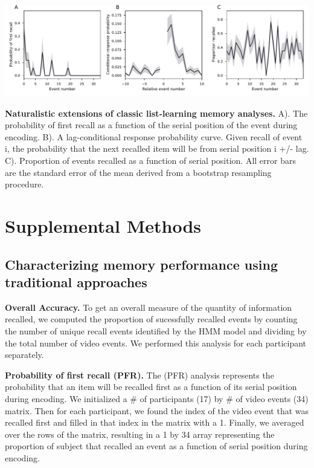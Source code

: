 \documentclass{article}
\begin{document}
{\begin{suppfigure}[t!]
\centering
\includegraphics[width=1\textwidth]{figs/supp3_list_learning.pdf}
\caption{\small \textbf{Naturalistic extensions of classic list-learning memory analyses.} A). The probability of first recall as a function of the serial position of the event during encoding. B). A lag-conditional response probability curve. Given recall of event i, the probability that the next recalled item will be from serial position i +/- lag. C). Proportion of events recalled as a function of serial position. All error bars are the standard error of the mean derived from a bootstrap resampling procedure.}
\label{fig:list-learning}
\end{suppfigure}

\section{Supplemental Methods}

\subsection{Characterizing memory performance using traditional approaches}
\textbf{Overall Accuracy.}  To get an overall measure of the quantity of information recalled, we computed the proportion of sucessfully recalled events by counting the number of unique recall events identified by the HMM model and dividing by the total number of video events.  We performed this analysis for each participant separately.

\textbf{Probability of first recall (PFR).}  The (PFR) analysis represents the probability that an item will be recalled first as a function of its serial position during encoding. We initialized a \# of participants (17) by \# of video events (34) matrix. Then for each participant, we found the index of the video event that was recalled first and filled in that index in the matrix with a 1.  Finally, we averaged over the rows of the matrix, resulting in a 1 by 34 array representing the proportion of subject that recalled an event as a function of serial position during encoding.

}
\end{document}
